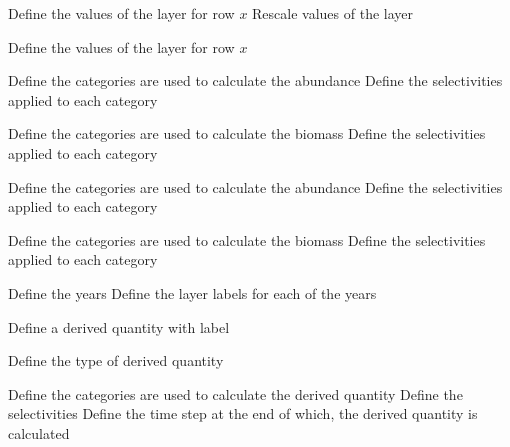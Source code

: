  {Define the values of the layer for row $x$}
 {Rescale values of the layer}
\par\textbf{}\par
{} {Define the values of the layer for row $x$}
\par\textbf{}\par
\par\textbf{}\par
{} {Define the categories are used to calculate the abundance}
 {Define the selectivities applied to each category}
\par\textbf{}\par
{} {Define the categories are used to calculate the biomass}
 {Define the selectivities applied to each category}
\par\textbf{}\par
{} {Define the categories are used to calculate the abundance}
 {Define the selectivities applied to each category}
\par\textbf{}\par
{} {Define the categories are used to calculate the biomass}
 {Define the selectivities applied to each category}
\par\textbf{}\par
{} {Define the years}
 {Define the layer labels for each of the years}
\par {} {Define a derived quantity with label}\par
{} {Define the type of derived quantity}
\par\textbf{}\par
{} {Define the categories are used to calculate the derived quantity}
 {Define the selectivities}
 {Define the time step at the end of which, the derived quantity is calculated}
